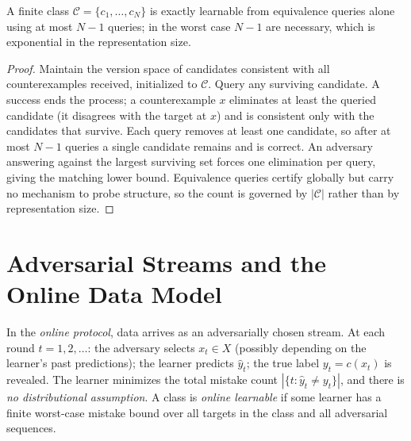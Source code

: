 \begin{prop}
\label{prop:eq-alone}
A finite class $\mathcal{C} = \{c_1, \ldots, c_N\}$ is exactly learnable from equivalence queries alone using at most $N - 1$ queries; in the worst case $N - 1$ are necessary, which is exponential in the representation size.
\end{prop}
\begin{proof}
Maintain the version space of candidates consistent with all counterexamples received, initialized to $\mathcal{C}$. Query any surviving candidate. A success ends the process; a counterexample $x$ eliminates at least the queried candidate (it disagrees with the target at $x$) and is consistent only with the candidates that survive. Each query removes at least one candidate, so after at most $N - 1$ queries a single candidate remains and is correct. An adversary answering against the largest surviving set forces one elimination per query, giving the matching lower bound. Equivalence queries certify globally but carry no mechanism to probe structure, so the count is governed by $|\mathcal{C}|$ rather than by representation size.
\end{proof}


\section{Adversarial Streams and the Online Data Model}
\label{sec:streams}

\begin{defn}
\label{def:data-stream}
In the \emph{online protocol}, data arrives as an adversarially chosen stream. At each round $t = 1, 2, \ldots$: the adversary selects $x_t \in X$ (possibly depending on the learner's past predictions); the learner predicts $\hat{y}_t$; the true label $y_t = c(x_t)$ is revealed. The learner minimizes the total mistake count $|\{t : \hat{y}_t \neq y_t\}|$, and there is \emph{no distributional assumption}. A class is \emph{online learnable} if some learner has a finite worst-case mistake bound over all targets in the class and all adversarial sequences.
\end{defn}


